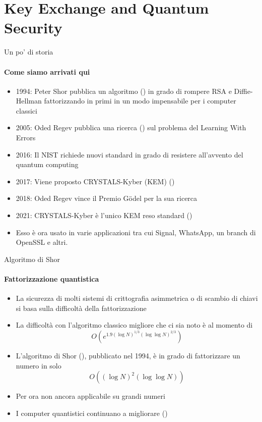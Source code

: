 \section{Key Exchange and Quantum Security}

\begin{frame}{Un po' di storia}

\framesubtitle{Come siamo arrivati qui}

\begin{itemize}%
    \item 1994: Peter Shor pubblica un algoritmo (\cite{shor,shor2}) in grado di rompere RSA e Diffie-Hellman fattorizzando in primi in un modo impensabile per i computer classici
    \item 2005: Oded Regev pubblica una ricerca (\cite{regev}) sul problema del Learning With Errors
    \item 2016: Il NIST richiede nuovi standard in grado di resistere all'avvento del quantum computing
    \item 2017: Viene proposto CRYSTALS-Kyber (KEM) (\cite{ufficiale})
    \item 2018: Oded Regev vince il Premio Gödel per la sua ricerca
    \item 2021: CRYSTALS-Kyber è l'unico KEM reso standard (\cite{nistwinners})
    \item Esso è ora usato in varie applicazioni tra cui Signal, WhatsApp, un branch di OpenSSL e altri.
\end{itemize}

\end{frame}

\begin{frame}{Algoritmo di Shor}
\framesubtitle{Fattorizzazione quantistica}

\begin{itemize}%
    \item La sicurezza di molti sistemi di crittografia asimmetrica o di scambio di chiavi si basa sulla difficoltà della fattorizzazione
    \item La difficoltà con l'algoritmo classico migliore che ci sia noto è al momento di \[
            O\left(e^{1.9(\log N)^{1/3}(\log\log N)^{2/3}}\right)
\]
    \item L'algoritmo di Shor (\cite{shor,shor2}), pubblicato nel 1994, è in grado di fattorizzare un numero in solo \[
    O\left((\log N)^2(\log\log N)\right)
\]
    \item Per ora non ancora applicabile su grandi numeri
    \item I computer quantistici continuano a migliorare (\cite{shorreal})
\end{itemize}
\end{frame}

